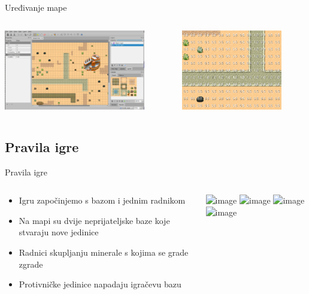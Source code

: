 \documentclass[utf8]{beamer}
\begin{document}
\begin{frame}{Uređivanje mape}
    \begin{columns}[c]
        \begin{column}{0.6\textwidth}
            \includegraphics[height=3.5cm]{images/mapEditing.png}
        \end{column}

        \begin{column}{0.4\textwidth}
            \includegraphics[height=3.5cm]{images/tileModifiers.png}
        \end{column}
    \end{columns}
\end{frame}

\subsection{Pravila igre}

\begin{frame}{Pravila igre}
    \begin{columns}[c]
        \begin{column}{0.5\textwidth}
            \begin{itemize}
                \item<1-> Igru započinjemo s bazom i jednim radnikom
                \item<2-> Na mapi su dvije neprijateljske baze koje stvaraju nove jedinice
                \item<3-> Radnici skupljanju minerale s kojima se grade zgrade
                \item<4-> Protivničke jedinice napadaju igračevu bazu
            \end{itemize}
        \end{column}

        \begin{column}{0.5\textwidth}
            \includegraphics<1>[width=1.0\textwidth]{images/gameStart.png}
            \includegraphics<2>[width=1.0\textwidth]{images/enemyBases.png}
            \includegraphics<3>[width=1.0\textwidth]{images/building.png}
            \includegraphics<4>[width=1.0\textwidth]{images/battle.png}
        \end{column}

    \end{columns}
\end{frame}
\end{document}
